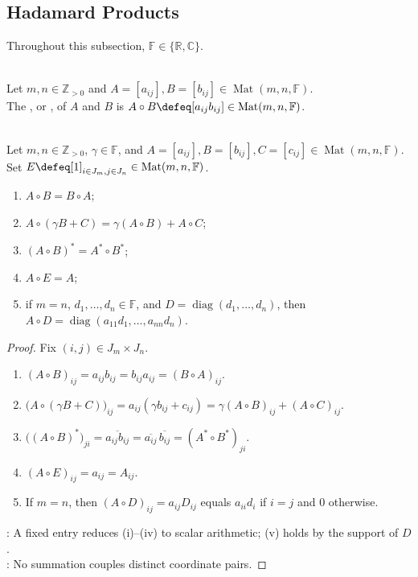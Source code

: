 \subsection{Hadamard Products}

Throughout this subsection, $\mathbb{F}\in\{\mathbb{R},\mathbb{C}\}$.

\begin{definition} \label{def:hadamard-product} \\
Let $m,n\in\mathbb{Z}_{>0}$ and $A=[a_{ij}],B=[b_{ij}]\in\operatorname{Mat}(m,n,\mathbb{F})$.\\
The , or , of $A$ and $B$ is $A\circ B\defeq [a_{ij}b_{ij}]\in\operatorname{Mat}(m,n,\mathbb{F})$.
\end{definition}

\begin{proposition} \label{prop:basic-hadamard-identities} \\
Let $m,n\in\mathbb{Z}_{>0}$, $\gamma\in\mathbb{F}$, and $A=[a_{ij}],B=[b_{ij}],C=[c_{ij}]\in\operatorname{Mat}(m,n,\mathbb{F})$. Set $E\defeq[1]_{i\in J_m,j\in J_n}\in\operatorname{Mat}(m,n,\mathbb{F})$.
\begin{enumerate}[label=(\roman*)]
\setlength{\itemsep}{0pt}
\item $A\circ B=B\circ A$;
\item $A\circ(\gamma B+C)=\gamma(A\circ B)+A\circ C$;
\item $(A\circ B)^*=A^*\circ B^*$;
\item $A\circ E=A$;
\item if $m=n$, $d_1,\ldots,d_n\in\mathbb{F}$, and $D=\operatorname{diag}(d_1,\ldots,d_n)$, then $A\circ D=\operatorname{diag}(a_{11}d_1,\ldots,a_{nn}d_n)$.
\end{enumerate}
\begin{proof}
Fix $(i,j)\in J_m\times J_n$.
\begin{enumerate}[label=(\roman*)]
\setlength{\itemsep}{0pt}
\item $(A\circ B)_{ij}=a_{ij}b_{ij}=b_{ij}a_{ij}=(B\circ A)_{ij}$.
\item $\bigl(A\circ(\gamma B+C)\bigr)_{ij}=a_{ij}(\gamma b_{ij}+c_{ij})=\gamma(A\circ B)_{ij}+(A\circ C)_{ij}$.
\item $\bigl((A\circ B)^*\bigr)_{ji}=\overline{a_{ij}b_{ij}}=\overline{a_{ij}}\,\overline{b_{ij}}=(A^*\circ B^*)_{ji}$.
\item $(A\circ E)_{ij}=a_{ij}=A_{ij}$.
\item If $m=n$, then $(A\circ D)_{ij}=a_{ij}D_{ij}$ equals $a_{ii}d_i$ if $i=j$ and $0$ otherwise.
\end{enumerate}
: A fixed entry reduces (i)--(iv) to scalar arithmetic; (v) holds by the support of $D$.\\
: No summation couples distinct coordinate pairs.
\end{proof}
\end{proposition}


